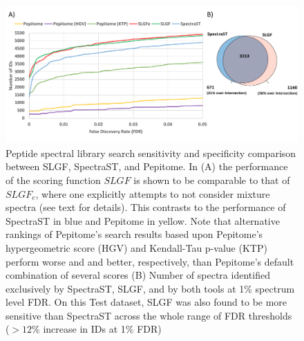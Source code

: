 \documentclass[endnotes,11pt]{article}
\begin{document}
\begin{figure}[!h]
 \centering
	\includegraphics[scale=.64]{ROCCurve_Venn5.pdf}
	\vspace{-0.2in}
  \caption{Peptide spectral library search sensitivity and specificity comparison between SLGF, SpectraST, and Pepitome.  In (A) the performance of the scoring function $SLGF$ is shown to be comparable to that of $SLGF_e$, where one explicitly attempts to not consider mixture spectra (see text for details). This contrasts to the performance of SpectraST in blue and Pepitome in yellow. Note that alternative rankings of Pepitome's search results based upon Pepitome's hypergeometric score (HGV) and Kendall-Tau p-value (KTP) perform worse and and better, respectively, than Pepitome's default combination of several scores (B) Number of spectra identified exclusively by SpectraST, SLGF, and by both tools at 1\% spectrum level FDR. On this Test dataset, SLGF was also found to be more sensitive than SpectraST across the whole range of FDR thresholds ($>12\%$ increase in IDs at 1\% FDR)}
	\label{SLGFSearchROCVenn}
\end{figure}

\end{document}
